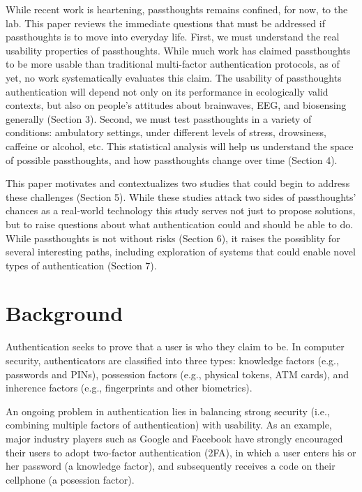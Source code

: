 \documentclass[sigconf]{acmart}
\begin{document}
While recent work is heartening, passthoughts remains confined, for now, to the lab.
This paper reviews the immediate questions that must be addressed if passthoughts is to move into everyday life.
First, we must understand the real usability properties of passthoughts.
While much work has claimed passthoughts to be more usable than traditional multi-factor authentication protocols,
as of yet, no work systematically evaluates this claim.
The usability of passthoughts authentication will depend not only on its performance in ecologically valid contexts,
but also on people's attitudes about brainwaves, EEG, and biosensing generally (Section 3).
Second, we must test passthoughts in a variety of conditions: ambulatory settings, under different levels of stress, drowsiness, caffeine or alcohol, etc.
This statistical analysis will help us understand 
the space of possible passthoughts,
and how passthoughts change over time (Section 4).

This paper motivates and contextualizes two studies that could begin to address these challenges (Section 5).
While these studies attack two sides of passthoughts' chances as a real-world technology
this study serves not just to propose solutions, but to raise questions about what authentication could and should be able to do.
While passthoughts is not without risks (Section 6),
it raises the possiblity for several interesting paths,
including exploration of systems that could enable novel types of authentication (Section 7).

\section{Background}
\label{sec:orgc5b76aa}

Authentication seeks to prove that a user is who they claim to be.
In computer security, authenticators are classified into three types: knowledge factors (e.g., passwords
and PINs), possession factors (e.g., physical tokens, ATM cards), and inherence
factors (e.g., fingerprints and other biometrics). 

An ongoing problem in authentication lies in balancing strong security
(i.e., combining multiple factors of authentication)
with usability.
As an example, major industry players such as Google and
Facebook have strongly encouraged their users to adopt two-factor
authentication (2FA), in which a user enters his or her password (a knowledge factor),
and subsequently receives a code on their cellphone (a posession factor).
\end{document}
